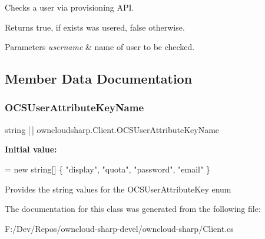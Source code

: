Checks a user via provisioning A\+PI. 

\begin{DoxyReturn}{Returns}
{\ttfamily true}, if exists was usered, {\ttfamily false} otherwise.
\end{DoxyReturn}

\begin{DoxyParams}{Parameters}
{\em username} & name of user to be checked.\\
\hline
\end{DoxyParams}


\subsection{Member Data Documentation}
\mbox{\label{classowncloudsharp_1_1_client_ab76a3a9733caa38abf39f08c50bc4542}} 
\subsubsection{\texorpdfstring{O\+C\+S\+User\+Attribute\+Key\+Name}{OCSUserAttributeKeyName}}
{\footnotesize\ttfamily string \mbox{[}$\,$\mbox{]} owncloudsharp.\+Client.\+O\+C\+S\+User\+Attribute\+Key\+Name\hspace{0.3cm}{\ttfamily [static]}}

{\bfseries Initial value\+:}
\begin{DoxyCode}
= \textcolor{keyword}{new} \textcolor{keywordtype}{string}[] \{
        \textcolor{stringliteral}{"display"},
        \textcolor{stringliteral}{"quota"},
        \textcolor{stringliteral}{"password"},
        \textcolor{stringliteral}{"email"}
        \}
\end{DoxyCode}


Provides the string values for the O\+C\+S\+User\+Attribute\+Key enum 



The documentation for this class was generated from the following file\+:\begin{DoxyCompactItemize}
\item 
F\+:/\+Dev/\+Repos/owncloud-\/sharp-\/devel/owncloud-\/sharp/Client.\+cs\end{DoxyCompactItemize}
